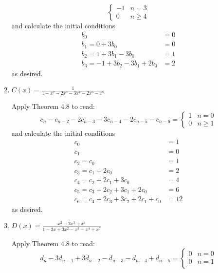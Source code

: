\begin{enumerate}
\begin{sol}
\[\begin{cases}
              -1 & n = 3    \\
              0  & n \geq 4
            \end{cases}
          \]
          and calculate the initial conditions
          \begin{align*}
            b_0                           & = 0 \\
            b_1 = 0 + 3b_0                & = 0 \\
            b_2 = 1 + 3b_1 - 3b_0         & = 1 \\
            b_3 = -1 + 3b_2 - 3b_1 + 2b_0 & = 2
          \end{align*}
          as desired.
        \end{sol}
  \item $C(x) = \frac{1}{1 - x^2 - 2x^3 - 3x^4 - 2x^5 - x^6}$
        \begin{sol}
          Apply Theorem 4.8 to read:
          \[
            c_n - c_{n-2} - 2c_{n-3} - 3c_{n-4} - 2c_{n-5} - c_{n-6} = \begin{cases}
              1 & n = 0    \\
              0 & n \geq 1
            \end{cases}
          \]
          and calculate the initial conditions
          \begin{align*}
            c_0                                  & = 1  \\
            c_1                                  & = 0  \\
            c_2 = c_0                            & = 1  \\
            c_3 = c_1 + 2c_0                     & = 2  \\
            c_4 = c_2 + 2c_1 + 3c_0              & = 4  \\
            c_5 = c_3 + 2c_2 + 3c_1 + 2c_0       & = 6  \\
            c_6 = c_4 + 2c_3 + 3c_2 + 2c_1 + c_0 & = 12
          \end{align*}
          as desired.
        \end{sol}
  \item $D(x) = \frac{x^2 - 2x^3 + x^4}{1 - 3x + 3x^2 - x^3 - x^4 + x^5}$
        \begin{sol}
          Apply Theorem 4.8 to read:
          \[
            d_n - 3d_{n-1} + 3d_{n-2} - d_{n-3} - d_{n-4} + d_{n-5} = \begin{cases}
              0  & n = 0    \\
              0  & n = 1    \\

\end{cases}\]
\end{sol}
\end{enumerate}
